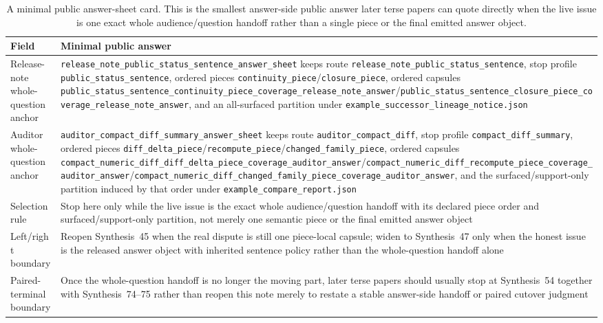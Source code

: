 \documentclass[11pt]{article}
\begin{document}
\begin{table}[t]
\centering
\small
\begin{tabularx}{\linewidth}{@{}lX@{}}
\toprule
Field & Minimal public answer \\
\midrule
Release-note whole-question anchor & \nolinkurl{release_note_public_status_sentence_answer_sheet} keeps route \nolinkurl{release_note_public_status_sentence}, stop profile \nolinkurl{public_status_sentence}, ordered pieces \nolinkurl{continuity_piece}/\nolinkurl{closure_piece}, ordered capsules \nolinkurl{public_status_sentence_continuity_piece_coverage_release_note_answer}/\nolinkurl{public_status_sentence_closure_piece_coverage_release_note_answer}, and an all-surfaced partition under \nolinkurl{example_successor_lineage_notice.json} \\
Auditor whole-question anchor & \nolinkurl{auditor_compact_diff_summary_answer_sheet} keeps route \nolinkurl{auditor_compact_diff}, stop profile \nolinkurl{compact_diff_summary}, ordered pieces \nolinkurl{diff_delta_piece}/\nolinkurl{recompute_piece}/\nolinkurl{changed_family_piece}, ordered capsules \nolinkurl{compact_numeric_diff_diff_delta_piece_coverage_auditor_answer}/\nolinkurl{compact_numeric_diff_recompute_piece_coverage_auditor_answer}/\nolinkurl{compact_numeric_diff_changed_family_piece_coverage_auditor_answer}, and the surfaced/support-only partition induced by that order under \nolinkurl{example_compare_report.json} \\
Selection rule & Stop here only while the live issue is the exact whole audience/question handoff with its declared piece order and surfaced/support-only partition, not merely one semantic piece or the final emitted answer object \\
Left/right boundary & Reopen Synthesis~45 when the real dispute is still one piece-local capsule; widen to Synthesis~47 only when the honest issue is the released answer object with inherited sentence policy rather than the whole-question handoff alone \\
Paired-terminal boundary & Once the whole-question handoff is no longer the moving part, later terse papers should usually stop at Synthesis~54 together with Synthesis~74--75 rather than reopen this note merely to restate a stable answer-side handoff or paired cutover judgment \\
\bottomrule
\end{tabularx}
\caption{A minimal public answer-sheet card. This is the smallest answer-side public answer later terse papers can quote directly when the live issue is one exact whole audience/question handoff rather than a single piece or the final emitted answer object.}
\label{tab:minimal-public-answer-sheet-card}
\end{table}
\end{document}
